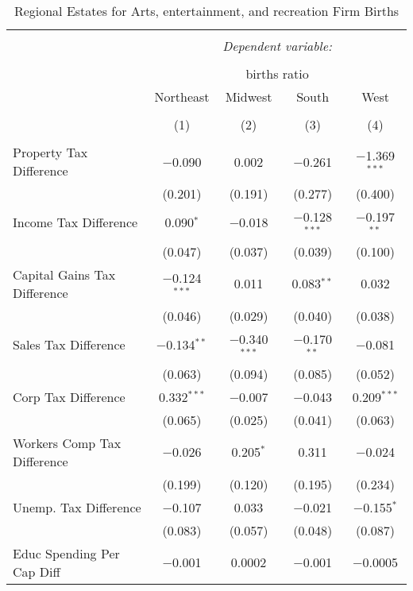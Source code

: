 
\begin{table}[!htbp] \centering 
  \caption{Regional Estates for  Arts, entertainment, and recreation Firm Births} 
  \label{} 
\begin{tabular}{@{\extracolsep{5pt}}lcccc} 
\\[-1.8ex]\hline 
\hline \\[-1.8ex] 
 & \multicolumn{4}{c}{\textit{Dependent variable:}} \\ 
\cline{2-5} 
\\[-1.8ex] & \multicolumn{4}{c}{births ratio} \\ 
 & Northeast & Midwest & South & West \\ 
\\[-1.8ex] & (1) & (2) & (3) & (4)\\ 
\hline \\[-1.8ex] 
 Property Tax Difference & $-$0.090 & 0.002 & $-$0.261 & $-$1.369$^{***}$ \\ 
  & (0.201) & (0.191) & (0.277) & (0.400) \\ 
  Income Tax Difference & 0.090$^{*}$ & $-$0.018 & $-$0.128$^{***}$ & $-$0.197$^{**}$ \\ 
  & (0.047) & (0.037) & (0.039) & (0.100) \\ 
  Capital Gains Tax Difference & $-$0.124$^{***}$ & 0.011 & 0.083$^{**}$ & 0.032 \\ 
  & (0.046) & (0.029) & (0.040) & (0.038) \\ 
  Sales Tax Difference & $-$0.134$^{**}$ & $-$0.340$^{***}$ & $-$0.170$^{**}$ & $-$0.081 \\ 
  & (0.063) & (0.094) & (0.085) & (0.052) \\ 
  Corp Tax Difference & 0.332$^{***}$ & $-$0.007 & $-$0.043 & 0.209$^{***}$ \\ 
  & (0.065) & (0.025) & (0.041) & (0.063) \\ 
  Workers Comp Tax Difference & $-$0.026 & 0.205$^{*}$ & 0.311 & $-$0.024 \\ 
  & (0.199) & (0.120) & (0.195) & (0.234) \\ 
  Unemp. Tax Difference & $-$0.107 & 0.033 & $-$0.021 & $-$0.155$^{*}$ \\ 
  & (0.083) & (0.057) & (0.048) & (0.087) \\ 
  Educ Spending Per Cap Diff & $-$0.001 & 0.0002 & $-$0.001 & $-$0.0005 \\ 

\end{tabular}
\end{table}
